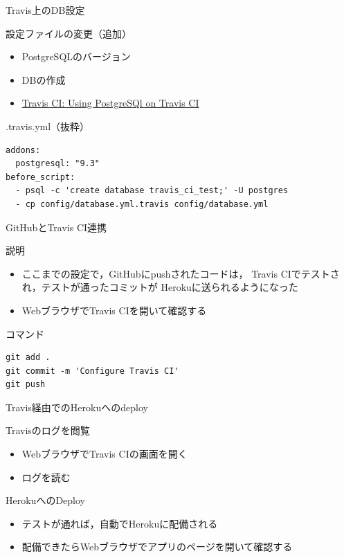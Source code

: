 \documentclass[t, aspectratio=169]{beamer}
\begin{document}
\begin{frame}[fragile,label=sec-7-3-6]{Travis上のDB設定}
 \begin{block}{設定ファイルの変更（追加）}
\begin{itemize}
\item PostgreSQLのバージョン
\item DBの作成
\item \href{http://docs.travis-ci.com/user/using-postgresql/}{Travis CI: Using PostgreSQl on Travis CI}
\end{itemize}
\end{block}

\begin{block}{.travis.yml（抜粋）}
\begin{verbatim}
addons:
  postgresql: "9.3"
before_script:
  - psql -c 'create database travis_ci_test;' -U postgres
  - cp config/database.yml.travis config/database.yml
\end{verbatim}
\end{block}
\end{frame}

\begin{frame}[fragile,label=sec-7-3-7]{GitHubとTravis CI連携}
 \begin{block}{説明}
\begin{itemize}
\item ここまでの設定で，GitHubにpushされたコードは，
Travis CIでテストされ，テストが通ったコミットが
Herokuに送られるようになった
\item WebブラウザでTravis CIを開いて確認する
\end{itemize}
\end{block}
\begin{block}{コマンド}
\begin{verbatim}
git add .
git commit -m 'Configure Travis CI'
git push
\end{verbatim}
\end{block}
\end{frame}

\begin{frame}[label=sec-7-3-8]{Travis経由でのHerokuへのdeploy}
\begin{block}{Travisのログを閲覧}
\begin{itemize}
\item WebブラウザでTravis CIの画面を開く
\item ログを読む
\end{itemize}
\end{block}
\begin{block}{HerokuへのDeploy}
\begin{itemize}
\item テストが通れば，自動でHerokuに配備される
\item 配備できたらWebブラウザでアプリのページを開いて確認する
\end{itemize}
\end{block}
\end{frame}
\end{document}
